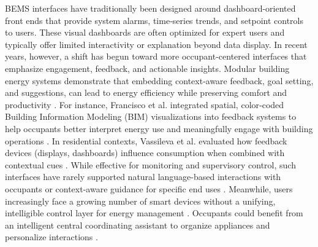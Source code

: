 \documentclass[final,3p,times]{elsarticle}
\begin{document}
BEMS interfaces have traditionally been designed around dashboard-oriented front ends that provide system alarms, time‐series trends, and setpoint controls to users. These visual dashboards are often optimized for expert users and typically offer limited interactivity or explanation beyond data display. In recent years, however, a shift has begun toward more occupant-centered interfaces that emphasize engagement, feedback, and actionable insights. Modular building energy systems demonstrate that embedding context-aware feedback, goal setting, and suggestions, can lead to energy efficiency while preserving comfort and productivity \cite{bonino2012home,jazizadeh2012human}. For instance, Francisco et al. integrated spatial, color‐coded Building Information Modeling (BIM) visualizations into feedback systems to help occupants better interpret energy use and meaningfully engage with building operations \cite{francisco2018occupant}. In residential contexts, Vassileva et al. evaluated how feedback devices (displays, dashboards) influence consumption when combined with contextual cues \cite{vassileva2013energy}. While effective for monitoring and supervisory control, such interfaces have rarely supported natural language-based interactions with occupants or context-aware guidance for specific end uses \cite{jin2017foresee}. Meanwhile, users increasingly face a growing number of smart devices without a unifying, intelligible control layer for energy management \cite{jin2017foresee}. Occupants could benefit from an intelligent central coordinating assistant to organize appliances and personalize interactions \cite{chen2017butler}.
\end{document}
